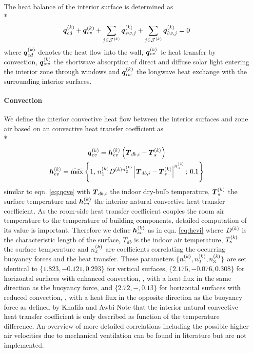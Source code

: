 The heat balance of the interior surface is determined as \\*
\begin{equation} \label{eq:intersurf}
\boldsymbol{q}_{cd}^{(k)} + \boldsymbol{q}_{cv}^{(k)} + \sum_{j \in \mathcal{J}^{(k)}} \boldsymbol{q}_{sw,j}^{(k)} + \sum_{j \in \mathcal{J}^{(k)}} \boldsymbol{q}_{lw,j}^{(k)} = 0
\end{equation}
where $\boldsymbol{q}_{cd}^{(k)}$ denotes the heat flow into the wall, $\boldsymbol{q}_{cv}^{(k)}$ te heat transfer by convection, $\boldsymbol{q}_{sw}^{(k)}$ the shortwave absorption of direct and diffuse solar light entering the interior zone through windows and $\boldsymbol{q}_{lw}^{(k)}$ the longwave heat exchange with the surrounding interior surfaces.

\paragraph{Convection}
We define the interior convective heat flow between the interior surfaces and zone air based on an convective heat transfer coefficient as \\*
\begin{gather}
\boldsymbol{q}_{cv}^{(k)} = \boldsymbol{h}_{cv}^{(k)} \left(\boldsymbol{T}_{db,i} - \boldsymbol{T}_{s}^{(k)}\right) \\
\boldsymbol{h}_{cv}^{(k)} = \widetilde{\max}\left\{1,\,n_{1}^{(k)} D^{(k) n_{2}^{(k)}} \left|\boldsymbol{T}_{db,i}-\boldsymbol{T}_{s}^{(k)}\right|^{n_{3}^{(k)}} ;\, 0.1 \right\}
\label{eq:hcvi}
\end{gather}
similar to eqn. \ref{eq:qcve} with $\boldsymbol{T}_{db,i}$ the indoor dry-bulb temperature, $\boldsymbol{T}_{s}^{(k)}$ the surface temperature and $\boldsymbol{h}_{cv}^{(k)}$ the interior natural convective heat transfer coefficient. As the room-side heat transfer coefficient couples the room air temperature to the temperature of building components, detailed computation of its value is important. Therefore we define $\boldsymbol{h}_{cv}^{(k)}$ as in eqn. \ref{eq:hcvi} where $D^{(k)}$ is the characteristic length of the surface, $T_{db}$ is the indoor air temperature, $T_{s}^{(k)}$ the surface temperature and $n_{x}^{(k)}$ are coefficients correlating the occurring buoyancy forces and the heat transfer. These parameters $\{n_{1}^{(k)},n_{2}^{(k)},n_{3}^{(k)}\}$ are set identical to $\{1.823,-0.121,0.293\}$ for vertical surfaces, $\{2.175,-0.076,0.308\}$ for horizontal surfaces with enhanced convection, \ie, with a heat flux in the same direction as the buoyancy force, and $\{2.72,-,0.13\}$ for horizontal surfaces with reduced convection, \ie, with a heat flux in the opposite direction as the buoyancy force as defined by Khalifa \etal and Awbi \etal\citep{Khalifa2001,Awbi1999} Note that the interior natural convective heat transfer coefficient is only described as function of the temperature difference. An overview of more detailed correlations including the possible higher air velocities due to mechanical ventilation can be found in literature but are not implemented.\citep{Beausoleil-Morrison2000}

